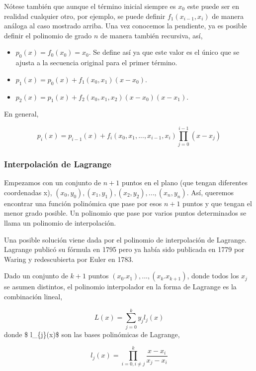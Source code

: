 \documentclass[
  12pt,
]{krantz}
\providecommand{\tightlist}{%
  \setlength{\itemsep}{0pt}\setlength{\parskip}{0pt}}
\begin{document}
Nótese también que aunque el término inicial siempre es \(x_{0}\) este puede ser en realidad cualquier otro, por ejemplo, se puede definir \(f_{1}(x_{i-1},x_{i})\) de manera análoga al caso mostrado arriba. Una vez conocemos la pendiente, ya es posible definir el polinomio de grado \(n\) de manera también recursiva, así,

\begin{itemize}
\tightlist
\item
  \(p_{0}(x) = f_{0} (x_{0}) =x_{0}\). Se define así ya que este valor es el único que se ajusta a la secuencia original para el primer término.
\item
  \(\displaystyle{p_{1}(x) = p_{0}(x) + f_{1} (x_{0},x_{1}) (x-x_{0})}\).
\item
  \(\displaystyle{p_{2}(x) = p_{1}(x) + f_{2} (x_{0},x_{1},x_{2}) (x-x_{0})(x-x_{1})}\).
\end{itemize}

En general,

\[\displaystyle{p_{i}(x) = p_{i-1}(x) +  f_{i} (x_{0},x_{1},...,x_{i-1},x_{i}) \prod_{j=0}^{i-1}(x-x_{j})}\]

\hypertarget{interpolacion-de-lagrange}{%
\subsubsection{Interpolación de Lagrange}\label{interpolacion-de-lagrange}}

Empezamos con un conjunto de \(n+1\) puntos en el plano (que tengan diferentes coordenadas x), \((x_{0}, y_{0}), (x_{1}, y_{1}), (x_{2}, y_{2}),...,(x_{n}, y_{n})\). Así, queremos encontrar una función polinómica que pase por esos \(n+1\) puntos y que tengan el menor grado posible. Un polinomio que pase por varios puntos determinados se llama un polinomio de interpolación.

Una posible solución viene dada por el polinomio de interpolación de Lagrange. Lagrange publicó su fórmula en 1795 pero ya había sido publicada en 1779 por Waring y redescubierta por Euler en 1783.

Dado un conjunto de \(k + 1\) puntos \((x_{0}.x_{1}),...,(x_{k}.x_{k+1})\), donde todos los \(x_{j}\) se asumen distintos, el polinomio interpolador en la forma de Lagrange es la combinación lineal,

\[\displaystyle{L(x) = \sum_{j=0}^{k} y_{j} l_{j}(x)}\]
donde \$ l\_\{j\}(x)\$ son las bases polinómicas de Lagrange,

\[\displaystyle{l_{j}(x) = \prod_{i=0,i \neq j}^{k} \frac{x-x_{i}}{x_{j}-x_{i}}  }\]
\end{document}
